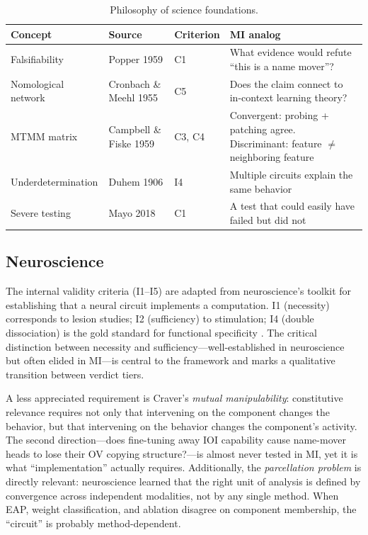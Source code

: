 \documentclass[10pt]{article}
\begin{document}
\begin{table}[H]
\centering\small
\caption{Philosophy of science foundations.}
\renewcommand{\arraystretch}{1.12}
\begin{tabular}{@{}l>{\raggedright\arraybackslash}p{2cm}l>{\raggedright\arraybackslash}p{4.5cm}@{}}
\toprule
\textbf{Concept} & \textbf{Source} & \textbf{Criterion} & \textbf{MI analog} \\
\midrule
Falsifiability & Popper 1959 & C1 & What evidence would refute ``this is a name mover''? \\
\midrule
Nomological network & Cronbach \& Meehl 1955 & C5 & Does the claim connect to in-context learning theory? \\
\midrule
MTMM matrix & Campbell \& Fiske 1959 & C3, C4 & Convergent: probing + patching agree. Discriminant: feature $\neq$ neighboring feature \\
\midrule
Underdetermination & Duhem 1906 & I4 & Multiple circuits explain the same behavior \\
\midrule
Severe testing & Mayo 2018 & C1 & A test that could easily have failed but did not \\
\bottomrule
\end{tabular}
\end{table}

\subsection{Neuroscience}
\label{sec:neuro}

The internal validity criteria (I1--I5) are adapted from neuroscience's toolkit for establishing that a neural circuit implements a computation. I1 (necessity) corresponds to lesion studies; I2 (sufficiency) to stimulation; I4 (double dissociation) is the gold standard for functional specificity \citep{woodward2003making}. The critical distinction between necessity and sufficiency---well-established in neuroscience but often elided in MI---is central to the framework and marks a qualitative transition between verdict tiers.

A less appreciated requirement is Craver's \emph{mutual manipulability}: constitutive relevance requires not only that intervening on the component changes the behavior, but that intervening on the behavior changes the component's activity. The second direction---does fine-tuning away IOI capability cause name-mover heads to lose their OV copying structure?---is almost never tested in MI, yet it is what ``implementation'' actually requires. Additionally, the \emph{parcellation problem} is directly relevant: neuroscience learned that the right unit of analysis is defined by convergence across independent modalities, not by any single method. When EAP, weight classification, and ablation disagree on component membership, the ``circuit'' is probably method-dependent.
\end{document}
